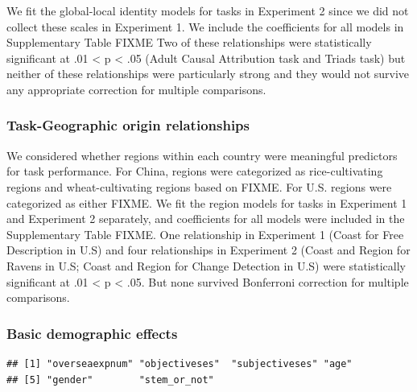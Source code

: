 \documentclass[
  man]{apa6}
\begin{document}
We fit the global-local identity models for tasks in Experiment 2 since we did not collect these scales in Experiment 1. We include the coefficients for all models in Supplementary Table FIXME Two of these relationships were statistically significant at .01 \textless{} p \textless{} .05 (Adult Causal Attribution task and Triads task) but neither of these relationships were particularly strong and they would not survive any appropriate correction for multiple comparisons.

\hypertarget{task-geographic-origin-relationships}{%
\subsubsection{Task-Geographic origin relationships}\label{task-geographic-origin-relationships}}

We considered whether regions within each country were meaningful predictors for task performance. For China, regions were categorized as rice-cultivating regions and wheat-cultivating regions based on FIXME. For U.S. regions were categorized as either FIXME. We fit the region models for tasks in Experiment 1 and Experiment 2 separately, and coefficients for all models were included in the Supplementary Table FIXME. One relationship in Experiment 1 (Coast for Free Description in U.S) and four relationships in Experiment 2 (Coast and Region for Ravens in U.S; Coast and Region for Change Detection in U.S) were statistically significant at .01 \textless{} p \textless{} .05. But none survived Bonferroni correction for multiple comparisons.

\hypertarget{basic-demographic-effects}{%
\subsubsection{Basic demographic effects}\label{basic-demographic-effects}}

\begin{verbatim}
## [1] "overseaexpnum" "objectiveses"  "subjectiveses" "age"          
## [5] "gender"        "stem_or_not"
\end{verbatim}
\end{document}
